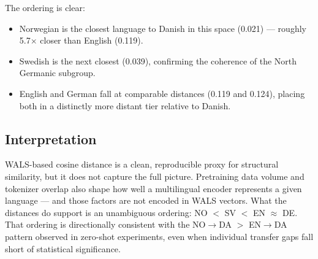 \begin{table}[t]
\centering
\small
{}
\caption{Pairwise cosine distances based on WALS syntactic features (lang2vec \texttt{syntax\_wals}). Lower = more similar. Norwegian is the closest language to Danish (0.021), followed by Swedish (0.039); English and German are substantially more distant ($\approx$0.12).}
\label{tab:language_distance}
\end{table}

The ordering is clear:
\begin{itemize}
  \item Norwegian is the closest language to Danish in this space (0.021) — roughly 5.7$\times$ closer than English (0.119).
  \item Swedish is the next closest (0.039), confirming the coherence of the North Germanic subgroup.
  \item English and German fall at comparable distances (0.119 and 0.124), placing both in a distinctly more distant tier relative to Danish.
\end{itemize}

\subsection{Interpretation}

WALS-based cosine distance is a clean, reproducible proxy for structural similarity, but it does not capture the full picture. Pretraining data volume and tokenizer overlap also shape how well a multilingual encoder represents a given language — and those factors are not encoded in WALS vectors. What the distances do support is an unambiguous ordering: NO $<$ SV $<$ EN $\approx$ DE. That ordering is directionally consistent with the NO$\rightarrow$DA $>$ EN$\rightarrow$DA pattern observed in zero-shot experiments, even when individual transfer gaps fall short of statistical significance.
